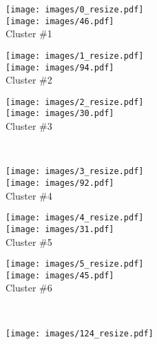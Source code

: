 \documentclass[runningheads]{llncs}
\begin{document}
\begin{figure}[!p]
\begin{center}
\begin{minipage}[b]{0.32\textwidth}
    \centering
    \texttt{[image: images/0\_resize.pdf]}\\
    \texttt{[image: images/46.pdf]}\\[-1mm]
    Cluster \#1
\end{minipage}
\begin{minipage}[b]{0.32\textwidth}
    \centering
    \texttt{[image: images/1\_resize.pdf]}\\
    \texttt{[image: images/94.pdf]}\\[-1mm]
    Cluster \#2
\end{minipage}
\begin{minipage}[b]{0.32\textwidth}
    \centering
    \texttt{[image: images/2\_resize.pdf]}\\
    \texttt{[image: images/30.pdf]}\\[-1mm]
    Cluster \#3
\end{minipage}\medskip \\
\begin{minipage}[b]{0.32\textwidth}
    \centering
    \texttt{[image: images/3\_resize.pdf]}\\
    \texttt{[image: images/92.pdf]}\\[-1mm]
    Cluster \#4
\end{minipage}
\begin{minipage}[b]{0.32\textwidth}
    \centering
    \texttt{[image: images/4\_resize.pdf]}\\
    \texttt{[image: images/31.pdf]}\\[-1mm]
    Cluster \#5
\end{minipage}
\begin{minipage}[b]{0.32\textwidth}
    \centering
    \texttt{[image: images/5\_resize.pdf]}\\
    \texttt{[image: images/45.pdf]}\\[-1mm]
    Cluster \#6
\end{minipage}\medskip \\
\begin{minipage}[b]{0.32\textwidth}
    \centering
    \texttt{[image: images/124\_resize.pdf]}\\

\end{minipage}
\end{center}
\end{figure}
\end{document}
